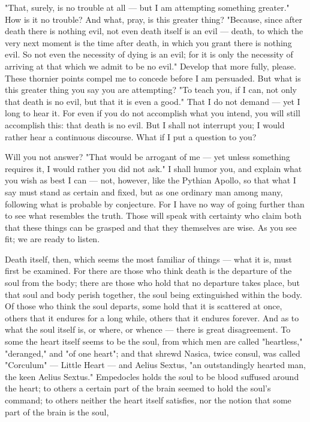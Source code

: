  "That, surely, is no trouble at all — but I am attempting something greater." How is it no trouble? And what, pray, is this greater thing? "Because, since after death there is nothing evil, not even death itself is an evil — death, to which the very next moment is the time after death, in which you grant there is nothing evil. So not even the necessity of dying is an evil; for it is only the necessity of arriving at that which we admit to be no evil." Develop that more fully, please. These thornier points compel me to concede before I am persuaded. But what is this greater thing you say you are attempting? "To teach you, if I can, not only that death is no evil, but that it is even a good." That I do not demand — yet I long to hear it. For even if you do not accomplish what you intend, you will still accomplish this: that death is no evil. But I shall not interrupt you; I would rather hear a continuous discourse. What if I put a question to you?

 Will you not answer? "That would be arrogant of me — yet unless something requires it, I would rather you did not ask." I shall humor you, and explain what you wish as best I can — not, however, like the Pythian Apollo, so that what I say must stand as certain and fixed, but as one ordinary man among many, following what is probable by conjecture. For I have no way of going further than to see what resembles the truth. Those will speak with certainty who claim both that these things can be grasped and that they themselves are wise. As you see fit; we are ready to listen.

 Death itself, then, which seems the most familiar of things — what it is, must first be examined. For there are those who think death is the departure of the soul from the body; there are those who hold that no departure takes place, but that soul and body perish together, the soul being extinguished within the body. Of those who think the soul departs, some hold that it is scattered at once, others that it endures for a long while, others that it endures forever. And as to what the soul itself is, or where, or whence — there is great disagreement. To some the heart itself seems to be the soul, from which men are called "heartless," "deranged," and "of one heart"; and that shrewd Nasica, twice consul, was called "Corculum" — Little Heart — and Aelius Sextus, "an outstandingly hearted man, the keen Aelius Sextus." Empedocles holds the soul to be blood suffused around the heart; to others a certain part of the brain seemed to hold the soul's command; to others neither the heart itself satisfies, nor the notion that some part of the brain is the soul,

